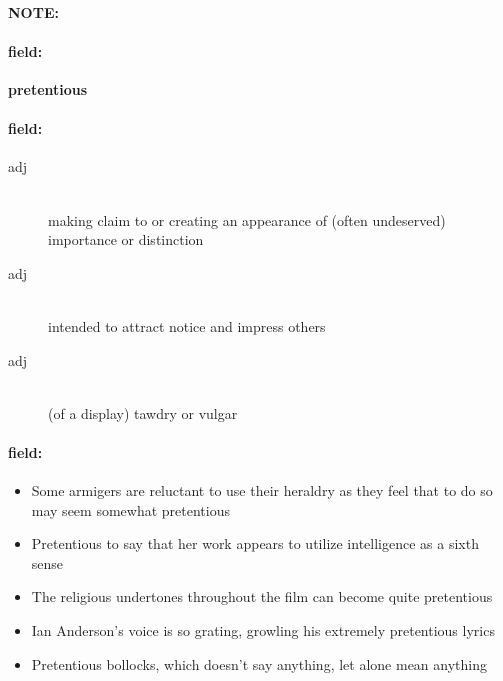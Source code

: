 \documentclass[12pt]{article}
\newenvironment{note}{\paragraph{NOTE:}}{}
\newenvironment{field}{\paragraph{field:}}{}
\begin{document}
\begin{note}
\begin{field}
\textbf{\large pretentious}
\end{field}


\begin{field}
\begin{description}
\item[adj] \hfill \\ 
making claim to or creating an appearance of (often undeserved) importance or distinction

\item[adj] \hfill \\ 
intended to attract notice and impress others

\item[adj] \hfill \\ 
(of a display) tawdry or vulgar

\end{description}
\end{field}

\begin{field}
\begin{itemize}
\item Some armigers are reluctant to use their heraldry as they feel that to do so may seem somewhat pretentious
\item Pretentious to say that her work appears to utilize intelligence as a sixth sense
\item The religious undertones throughout the film can become quite pretentious
\item Ian Anderson's voice is so grating, growling his extremely pretentious lyrics
\item Pretentious bollocks, which doesn't say anything, let alone mean anything
\end{itemize}
\end{field}
\end{note}
\end{document}
